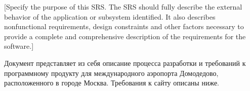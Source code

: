 [Specify the purpose of this SRS. The SRS should 
fully describe the external behavior of the 
application or subsystem identified. It also 
describes nonfunctional requirements, design 
constraints and other factors necessary to 
provide a complete and comprehensive description 
of the requirements for the software.]

Документ представляет из себя описание процесса разработки и требований к
программному продукту для международного
аэропорта Домодедово, расположенного в 
городе Москва. Требования к сайту описаны ниже.
